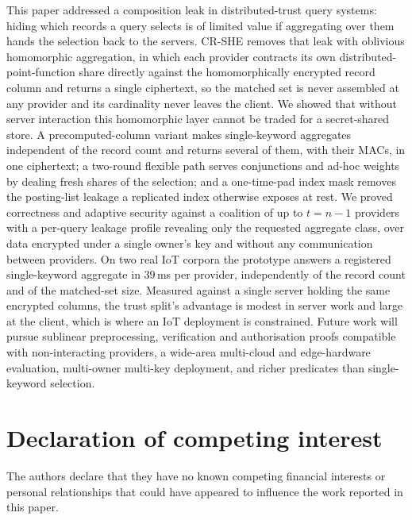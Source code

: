 \documentclass[a4paper,fleqn]{cas-sc}
\newif\ifanonymous
\begin{document}
This paper addressed a composition leak in distributed-trust query systems:
hiding which records a query selects is of limited value if aggregating over
them hands the selection back to the servers. CR-SHE removes that leak with
oblivious homomorphic aggregation, in which each provider contracts its own
distributed-point-function share directly against the homomorphically
encrypted record column and returns a single ciphertext, so the matched set is
never assembled at any provider and its cardinality never leaves the client.
We showed that without server interaction this homomorphic layer cannot be
traded for a secret-shared store. A precomputed-column variant makes
single-keyword aggregates independent of the record count and returns several
of them, with their MACs, in one ciphertext; a two-round flexible path serves
conjunctions and ad-hoc weights by dealing fresh shares of the selection; and
a one-time-pad index mask removes the posting-list leakage a replicated index
otherwise exposes at rest.
We proved correctness and adaptive security against a coalition of up to
$t=n-1$ providers with a per-query leakage profile revealing only the
requested aggregate class, over data encrypted under a single owner's key and
without any communication between providers. On two real IoT corpora the
prototype answers a registered single-keyword aggregate in $39$\,ms per
provider, independently of the record count and of the matched-set size.
Measured against a single server holding the same encrypted columns, the
trust split's advantage is modest in server work and large at the client,
which is where an IoT deployment is constrained. Future work will pursue sublinear
preprocessing, verification and authorisation proofs compatible with
non-interacting providers, a wide-area multi-cloud and edge-hardware
evaluation, multi-owner multi-key deployment, and richer predicates than
single-keyword selection.

\ifanonymous\else\printcredits\fi

\section*{Declaration of competing interest}
The authors declare that they have no known competing financial interests or
personal relationships that could have appeared to influence the work reported
in this paper.
\end{document}
